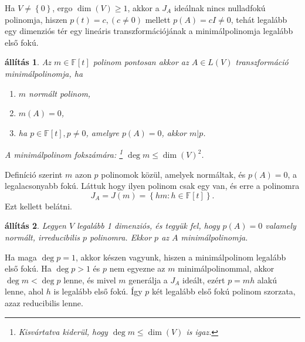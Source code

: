 \documentclass[9pt, a4paper, showtrims]{memoir}
\makeatletter
\renewenvironment{proof}[1][\proofname]
    {\par\pushQED{\qed}%
    \normalfont \topsep6\p@\@plus6\p@\relax
    \trivlist
    \item[\hskip\labelsep
        \itshape
    #1\@addpunct{:}]\ignorespaces}
    {\popQED\endtrivlist\@endpefalse}
\theoremstyle{plain}
\newtheorem{proposition}{állítás}[chapter]
\theoremstyle{remark}
\theoremstyle{definition}
\makeatother
\begin{document}
Ha $V\neq\left\{ 0 \right\}$, ergo $\dim(V)\geq 1$,
akkor a $J_{A}$ ideálnak nincs nulladfokú polinomja,
hiszen $p(t)=c, (c\neq 0)$ mellett
$p\left( A \right)=cI\neq 0$,
tehát legalább egy dimenziós tér egy lineáris transzformációjának a minimálpolinomja legalább első fokú.
\begin{proposition}
	Az  $m\in\mathbb{F}\left[ t \right]$ polinom pontosan akkor
	az $A\in L\left( V \right)$ transzformáció minimálpolinomja,
	ha
	\begin{enumerate}
		\item $m$ normált polinom,
		\item $m\left( A \right)=0$,
		\item ha $p\in\mathbb{F}\left[ t \right], p\neq 0$, amelyre
		      $p\left( A \right)=0$, akkor $m|p$.
	\end{enumerate}
	A minimálpolinom fokszámára:%
	\footnote{Kisvártatva kiderül, hogy $\deg m\leq \dim(V)$ is igaz.}%
	$\deg m\leq\dim(V)^2$.
\end{proposition}
\begin{proof}
	Definíció szerint $m$ azon $p$ polinomok közül,
	amelyek normáltak, és $p\left( A \right)=0$, a legalacsonyabb fokú.
	Láttuk hogy ilyen polinom csak egy van, és erre a polinomra
	\[
		J_{A}=J\left( m \right)=\left\{ hm:h\in\mathbb{F}\left[ t \right] \right\}.
	\]
	Ezt kellett belátni.
\end{proof}
\begin{proposition}
	Legyen $V$ legalább 1 dimenziós,
	és tegyük fel, hogy $p\left( A \right)=0$ valamely normált,
	irreducibilis $p$ polinomra.
	Ekkor $p$ az $A$ minimálpolinomja.
\end{proposition}
\begin{proof}
	Ha maga $\deg p=1$, akkor készen vagyunk, hiszen a minimálpolinom legalább első fokú.
	Ha $\deg p>1$ és $p$ nem egyezne az $m$ minimálpolinommal,
	akkor $\deg m<\deg p$ lenne, és mivel $m$ generálja a $J_{A}$ ideált,
	ezért $p=mh$ alakú lenne, ahol $h$ is legalább első fokú.
	Így $p$ két legalább első fokú polinom szorzata, azaz reducibilis lenne.
\end{proof}
\end{document}
